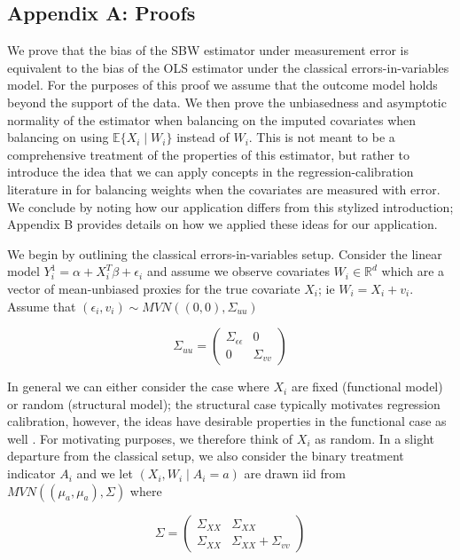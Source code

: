 \documentclass[12pt]{article}
\begin{document}
\subsection{Appendix A: Proofs}

We prove that the bias of the SBW estimator under measurement error is equivalent to the bias of the OLS estimator under the classical errors-in-variables model. For the purposes of this proof we assume that the outcome model holds beyond the support of the data. We then prove the unbiasedness and asymptotic normality of the estimator when balancing on the imputed covariates when balancing on using $\mathbb{E}\{X_i \mid W_i\}$ instead of $W_i$. This is not meant to be a comprehensive treatment of the properties of this estimator, but rather to introduce the idea that we can apply concepts in the regression-calibration literature in for balancing weights when the covariates are measured with error. We conclude by noting how our application differs from this stylized introduction; Appendix B provides details on how we applied these ideas for our application.

We begin by outlining the classical errors-in-variables setup. Consider the linear model $Y_i^1 = \alpha + X_i^T\beta + \epsilon_i$ and assume we observe covariates $W_i \in \mathbb{R}^d$ which are a vector of mean-unbiased proxies for the true covariate $X_i$; ie $W_i = X_i + v_i$. Assume that $(\epsilon_i, v_i) \sim MVN((0,0), \Sigma_{uu})$ 

$$
\Sigma_{uu} = \begin{pmatrix} 
\Sigma_{\epsilon\epsilon} & 0 \\ 
0 & \Sigma_{vv} 
\end{pmatrix}
$$ 

In general we can either consider the case where $X_i$ are fixed (functional model) or random (structural model); the structural case typically motivates regression calibration, however, the ideas have desirable properties in the functional case as well \cite{gleser1992importance}. For motivating purposes, we therefore think of $X_i$ as random. In a slight departure from the classical setup, we also consider the binary treatment indicator $A_i$ and we let $(X_i, W_i \mid A_i = a)$ are drawn iid from $MVN((\mu_a, \mu_a), \Sigma)$ where 

$$
\Sigma = \begin{pmatrix} 
\Sigma_{XX} & \Sigma_{XX} \\ 
\Sigma_{XX} & \Sigma_{XX} + \Sigma_{vv} 
\end{pmatrix}
$$ 
\end{document}
